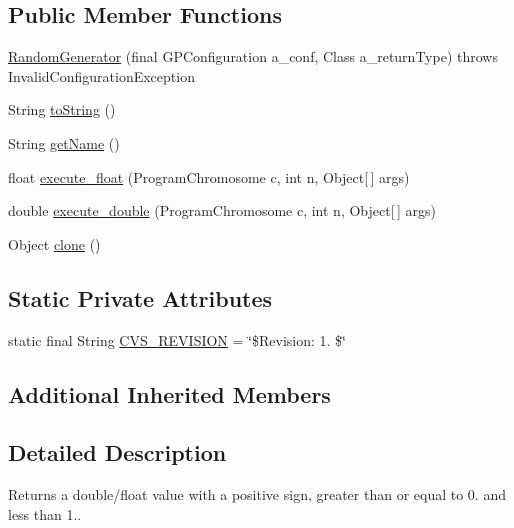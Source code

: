 \subsection*{Public Member Functions}
\begin{DoxyCompactItemize}
\item 
\hyperlink{classorg_1_1jgap_1_1gp_1_1function_1_1_random_generator_a208a74f78625d3b02a92d7e18f11f32a}{Random\-Generator} (final G\-P\-Configuration a\-\_\-conf, Class a\-\_\-return\-Type)  throws Invalid\-Configuration\-Exception 
\item 
String \hyperlink{classorg_1_1jgap_1_1gp_1_1function_1_1_random_generator_a17b95982c8d3ad1b7c25d9303fa7fa07}{to\-String} ()
\item 
String \hyperlink{classorg_1_1jgap_1_1gp_1_1function_1_1_random_generator_aa3ca8aac6d7eeb480328e302fe46dac3}{get\-Name} ()
\item 
float \hyperlink{classorg_1_1jgap_1_1gp_1_1function_1_1_random_generator_a2ba783886ed5140e6befdbdf153d110a}{execute\-\_\-float} (Program\-Chromosome c, int n, Object\mbox{[}$\,$\mbox{]} args)
\item 
double \hyperlink{classorg_1_1jgap_1_1gp_1_1function_1_1_random_generator_a21d40ec2baff264d4d0ed380c8e8c086}{execute\-\_\-double} (Program\-Chromosome c, int n, Object\mbox{[}$\,$\mbox{]} args)
\item 
Object \hyperlink{classorg_1_1jgap_1_1gp_1_1function_1_1_random_generator_ae7e0fce14181c970e365038f54a43baa}{clone} ()
\end{DoxyCompactItemize}
\subsection*{Static Private Attributes}
\begin{DoxyCompactItemize}
\item 
static final String \hyperlink{classorg_1_1jgap_1_1gp_1_1function_1_1_random_generator_a216c918225f29067c008cfffff5ec9e5}{C\-V\-S\-\_\-\-R\-E\-V\-I\-S\-I\-O\-N} = \char`\"{}\$Revision\-: 1. \$\char`\"{}
\end{DoxyCompactItemize}
\subsection*{Additional Inherited Members}


\subsection{Detailed Description}
Returns a double/float value with a positive sign, greater than or equal to 0. and less than 1..

